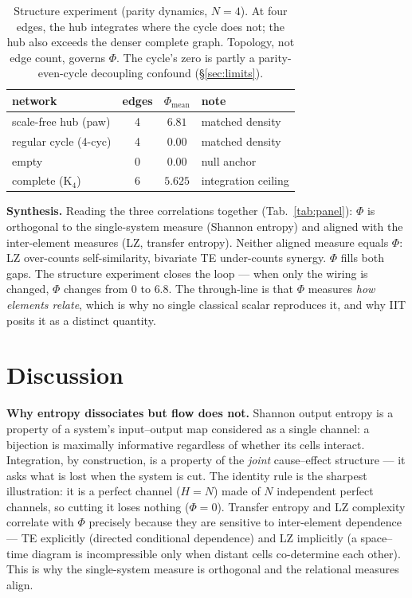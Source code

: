 \documentclass[11pt,a4paper]{article}
\newcommand{\bigphi}{\ensuremath{\Phi}}
\begin{document}
\begin{table}[t]
\centering
\small
\begin{tabular}{lccl}
\toprule
\textbf{network} & \textbf{edges} & \(\bigphi_\mathrm{mean}\) & \textbf{note} \\
\midrule
scale-free hub (paw) & 4 & \(6.81\) & matched density \\
regular cycle (4-cyc) & 4 & \(0.00\) & matched density \\
empty & 0 & \(0.00\) & null anchor \\
complete (K$_4$) & 6 & \(5.625\) & integration ceiling \\
\bottomrule
\end{tabular}
\caption{Structure experiment (parity dynamics, \(N=4\)). At four edges,
the hub integrates where the cycle does not; the hub also exceeds the
denser complete graph. Topology, not edge count, governs \bigphi{}. The
cycle's zero is partly a parity-even-cycle decoupling confound
(\S\ref{sec:limits}).}
\label{tab:results}
\end{table}

\medskip
\noindent\textbf{Synthesis.} Reading the three correlations together
(Tab.~\ref{tab:panel}): \bigphi{} is orthogonal to the single-system
measure (Shannon entropy) and aligned with the inter-element measures (LZ,
transfer entropy). Neither aligned measure equals \bigphi{}: LZ
over-counts self-similarity, bivariate TE under-counts synergy. \bigphi{}
fills both gaps. The structure experiment closes the loop --- when only
the wiring is changed, \bigphi{} changes from \(0\) to \(6.8\). The
through-line is that \bigphi{} measures \emph{how elements relate}, which
is why no single classical scalar reproduces it, and why IIT posits it as
a distinct quantity.

\section{Discussion}
\label{sec:discussion}

\textbf{Why entropy dissociates but flow does not.} Shannon output
entropy is a property of a system's input--output map considered as a
single channel: a bijection is maximally informative regardless of
whether its cells interact. Integration, by construction, is a property
of the \emph{joint} cause--effect structure --- it asks what is lost when
the system is cut. The identity rule is the sharpest illustration: it is
a perfect channel (\(H=N\)) made of \(N\) independent perfect channels, so
cutting it loses nothing (\(\bigphi=0\)). Transfer entropy and LZ
complexity correlate with \bigphi{} precisely because they are sensitive
to inter-element dependence --- TE explicitly (directed conditional
dependence) and LZ implicitly (a space--time diagram is incompressible
only when distant cells co-determine each other). This is why the
single-system measure is orthogonal and the relational measures align.
\end{document}
